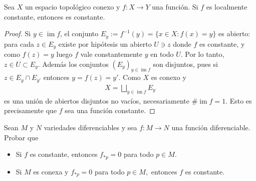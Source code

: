\documentclass[11pt]{article}
\newcommand{\im}{\operatorname{im}}
\newcommand{\paint}[2]{\color{#1}{#2}}
\newenvironment{lemma}[2][Lema]{\begin{trivlist}
\item[\hskip \labelsep \paint{red}{{\bfseries #1}}\hskip \labelsep {\bfseries #2.}]}{\end{trivlist}}
\newenvironment{exercise}[2][Ejercicio]{\begin{trivlist}
\item[\hskip \labelsep \paint{red}{{\bfseries #1}}\hskip \labelsep {\bfseries #2.}]}{\end{trivlist}}
\begin{document}
\begin{lemma}{2} Sea $X$ un espacio topol\'ogico conexo y  $f : X \to Y$ una funci\'on. Si $f$ es localmente constante, entonces es constante.
\end{lemma}
\begin{proof} Si $y \in \im f$, el conjunto $E_y := f^{-1}(y) = \{x \in X : f(x) = y\}$ es abierto: para cada $z \in E_y$ existe por hip\'otesis un abierto $U \ni z$ donde $f$ es constante, y como $f(z) = y$ luego $f$ vale constantemente $y$ en todo $U$. Por lo tanto, $z \in U \subset E_y$. Adem\'as los conjuntos $(E_y)_{y \in \im f}$ son disjuntos, pues si $z \in E_y \cap E_{y'}$ entonces $y = f(z) = y'$. Como $X$ es conexo y
\begin{align*}
X = \bigsqcup_{y \in \im f}E_y
\end{align*}
es una uni\'on de abiertos disjuntos no vac\'ios, necesariamente $\#\im f = 1$. Esto es precisamente que $f$ sea una funci\'on constante. 
\end{proof}

\begin{exercise}{12} Sean $M$ y $N$ variedades diferenciables y sea $f:M\to N$ una funci\'on diferenciable. Probar que
\begin{itemize}
\item Si $f$ es constante, entonces $f_{\ast p}=0$ para todo $p\in M$.

\item Si $M$ es conexa y $f_{\ast p}=0$ para todo $p\in M,$ entonces $f$ es
constante.
\end{itemize}
\end{exercise}
\end{document}

